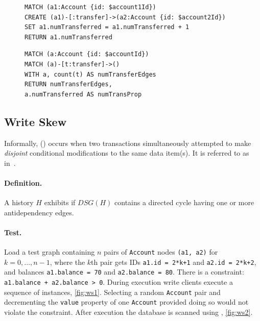 \begin{figure}[htb]
\centering
\begin{minipage}{0.41\linewidth}
\begin{lstlisting}[language=cypher,label=fig:lu1,caption=\tx{Lost Update $T_\mathrm{W}$}.]
MATCH (a1:Account {id: $account1Id})
CREATE (a1)-[:transfer]->(a2:Account {id: $account2Id})
SET a1.numTransferred = a1.numTransferred + 1
RETURN a1.numTransferred
\end{lstlisting}
\end{minipage}
\quad
\begin{minipage}{0.52\linewidth}
\begin{lstlisting}[language=cypher,label=fig:lu2,caption=\tx{Lost Update $T_\mathrm{R}$}.]
MATCH (a:Account {id: $accountId})
MATCH (a)-[t:transfer]->()
WITH a, count(t) AS numTransferEdges
RETURN numTransferEdges,
a.numTransferred AS numTransProp
\end{lstlisting}
\end{minipage}
\end{figure}

\subsection{Write Skew}
\label{sec:write-skew}

Informally,  () occurs when two transactions 
simultaneously attempted to make \emph{disjoint} conditional modifications to 
the same data item(s). It is referred to as  
in~\cite{adya1999weak,DBLP:journals/tods/FeketeLOOS05}.

\paragraph{Definition.}
A history $H$ exhibits  if $\textit{DSG}(H)$ contains a directed 
cycle having one or more antidependency edges.

\paragraph{Test.}
Load a test graph containing $n$ pairs of \texttt{Account} nodes 
\texttt{(a1, a2)} for $k = 0, \ldots, n-1$, where the $k$th pair gets IDs 
\texttt{a1.id = 2*k+1} and \texttt{a2.id = 2*k+2}, and balances 
\texttt{a1.balance = 70} and \texttt{a2.balance = 80}. There is a constraint: 
\texttt{a1.balance + a2.balance > 0}. During execution write clients execute a 
sequence of  instances, \autoref{fig:ws1}. Selecting a 
random \texttt{Account} pair and decrementing the \texttt{value} property of 
one \texttt{Account} provided doing so would not violate the constraint. After
execution the database is scanned using , \autoref{fig:ws2}.

